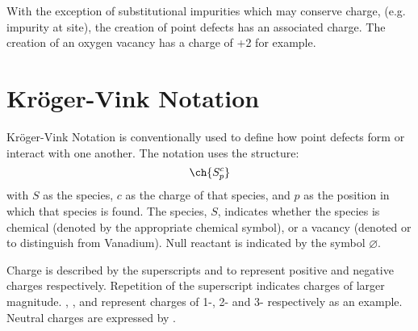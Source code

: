 With the exception of substitutional impurities which may conserve charge, (e.g.  impurity at  site), the creation of point defects has an associated charge. The creation of an oxygen vacancy has a charge of +2 for example.

\newpage
\section{Kr\"oger-Vink Notation}
Kr\"oger-Vink Notation \citep{Kroger1958} is conventionally used to define how point defects form or interact with one another.
The notation uses the structure: \begin{equation}
\ch{S^c_{p}}
\label{eq:kroger}
\end{equation} with $S$ as the species, $c$ as the charge of that species, and $p$ as the position in which that species is found.
The species, $S$, indicates whether the species is chemical (denoted by the appropriate chemical symbol), or a vacancy (denoted  or  to distinguish from Vanadium).
Null reactant is indicated by the symbol $\varnothing$.

Charge is described by the superscripts  and  to represent positive and negative charges respectively. Repetition of the superscript indicates charges of larger magnitude.
, , and  represent charges of 1-, 2- and 3- respectively as an example.
Neutral charges are expressed by .

